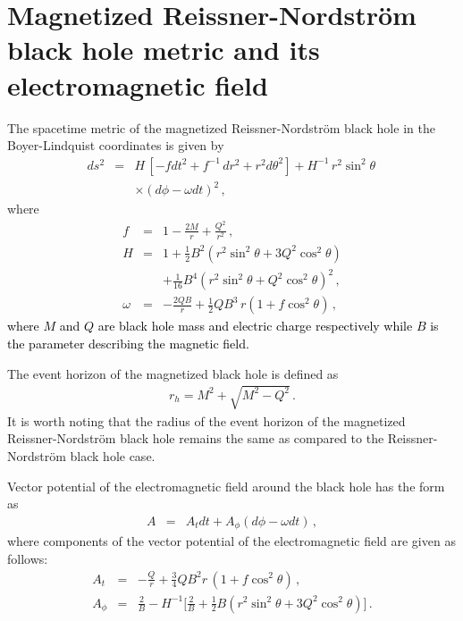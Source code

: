 \documentclass[showpacs,twocolumn,superscriptaddress]{revtex4}
\begin{document}
\section{Magnetized Reissner-Nordstr\"{o}m black hole metric and its electromagnetic field }\label{Sec:Magnetized}


The spacetime metric of the magnetized Reissner-Nordstr\"{o}m black hole in
the Boyer-Lindquist coordinates is given by \cite{Gibbons13}
%
%
\begin{eqnarray}\label{Eq:metric} d s^2 &=& H\, [-f dt^2 + f^{-1}\, dr^2  + r^2 d\theta^2] +
      H^{-1}\, r^2\sin^2\theta\, \nonumber\\
 &&\times(d\phi -\omega dt)^2\, ,
  \end{eqnarray}
where \begin{eqnarray}\label{Eq:fhw}
f&=& 1- \frac{2M}{r} + \frac{Q^2}{r^2}\, ,\nonumber\\
H &=& 1 +\frac{1}{2}B^2 (r^2\sin^2\theta + 3 Q^2\cos^2\theta)
\nonumber\\&&+
  \frac{1}{16} B^4 (r^2 \sin^2\theta + Q^2\cos^2\theta)^2\, ,\nonumber\\
\omega &=& -\frac{2Q B}{r} + \frac{1}{2} Q B^3\, r (1+f
\cos^2\theta)\, , \end{eqnarray}
%
\textcolor{black}{where $M$ and $Q$ are black hole mass and electric charge respectively while $B$ is the parameter describing the magnetic field. } 

The event horizon of the magnetized black hole is defined as 
 \begin{eqnarray}
 r_{h}=M^2+\sqrt{{M}^2-Q^{2}}\,.
 \end{eqnarray}
It is worth noting that the radius of the event horizon of the magnetized
Reissner-Nordstr\"{o}m black hole remains the same as compared to the Reissner-Nordstr\"{o}m black hole case. 

Vector potential of the electromagnetic field around the black hole has the form as
%
\begin{eqnarray}\label{Eq:4-vec}
A &=& A_t dt + A_\phi (d\phi-\omega dt)\, , 
\end{eqnarray}
%
where components of the vector potential of the
electromagnetic field are given as follows: 
%
 \begin{eqnarray}
A_t &=& -\frac{Q}{r} +\frac{3}{4} Q B^2 r\, (1+ f\cos^2\theta)\,,\nonumber\\
A_\phi &=& \frac{2}{B} - H^{-1}\Big[\frac{2}{B} +
             \frac{1}{2} B(r^2\sin^2\theta + 3 Q^2
             \cos^2\theta)\Big]\,. \nonumber\\
\end{eqnarray}
\end{document}
